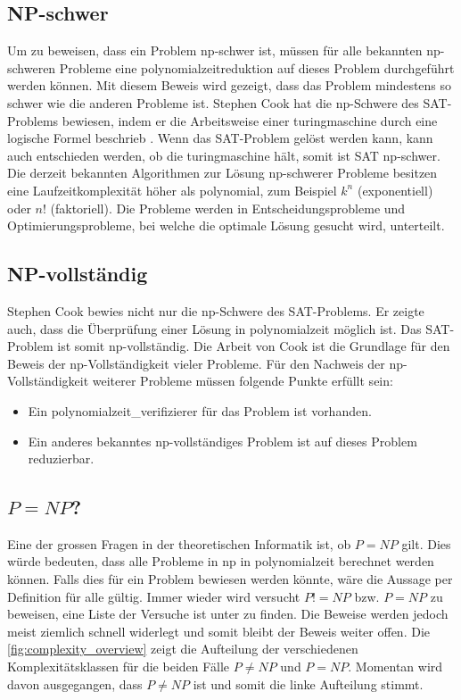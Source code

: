 \subsection{NP-schwer}\label{np_hard}
Um zu beweisen, dass ein Problem \gls{np}-schwer ist, müssen für alle bekannten \gls{np}-schweren Probleme eine \gls{polynomialzeitreduktion} auf dieses Problem durchgeführt werden können. 
Mit diesem Beweis wird gezeigt, dass das Problem mindestens so schwer wie die anderen Probleme ist. Stephen Cook hat die \gls{np}-Schwere des SAT-Problems bewiesen, indem er die 
Arbeitsweise einer  \gls{turingmaschine} durch eine logische Formel beschrieb \cite{cook_complexity}. Wenn das SAT-Problem gelöst 
werden kann, kann auch entschieden werden, ob die  \gls{turingmaschine} hält, somit ist SAT \gls{np}-schwer. Die derzeit bekannten 
Algorithmen zur Lösung \gls{np}-schwerer Probleme besitzen eine Laufzeitkomplexität höher als polynomial, zum Beispiel $k^n$ (exponentiell) oder $n!$ (faktoriell). Die Probleme werden in 
Entscheidungsprobleme und Optimierungsprobleme, bei welche die optimale Lösung gesucht wird, unterteilt.

\subsection{NP-vollständig}\label{np_complet}
Stephen Cook bewies nicht nur die \gls{np}-Schwere des SAT-Problems. Er zeigte auch, dass die Überprüfung einer Lösung in \gls{polynomialzeit} möglich ist. Das SAT-Problem ist somit
\gls{np}-vollständig. Die Arbeit von Cook ist die Grundlage für den Beweis der \gls{np}-Vollständigkeit vieler Probleme. Für den Nachweis der \gls{np}-Vollständigkeit weiterer Probleme müssen 
folgende Punkte erfüllt sein:
\begin{itemize}
	\item Ein \gls{polynomialzeit_verifizierer} für das Problem ist vorhanden.
	\item Ein anderes bekanntes \gls{np}-vollständiges Problem ist auf dieses Problem reduzierbar.
\end{itemize}

\subsection{$P = NP$?}
Eine der grossen Fragen in der theoretischen Informatik ist, ob $P = NP$ gilt. Dies würde bedeuten, dass alle Probleme in \gls{np} in \gls{polynomialzeit} berechnet werden können. Falls dies für ein 
Problem bewiesen werden könnte, wäre die Aussage per Definition für alle gültig. Immer wieder wird versucht $P!=NP$ bzw. $P=NP$ zu beweisen, eine Liste der Versuche ist unter 
\cite{proof_np_v_p} zu finden. Die Beweise werden jedoch meist ziemlich schnell widerlegt und somit bleibt der Beweis weiter offen. Die \autoref{fig:complexity_overview} zeigt die Aufteilung 
der verschiedenen Komplexitätsklassen für die beiden Fälle $P \neq NP$ und $P=NP$. Momentan wird davon ausgegangen, dass $P \neq NP$ ist und somit die linke Aufteilung stimmt.

